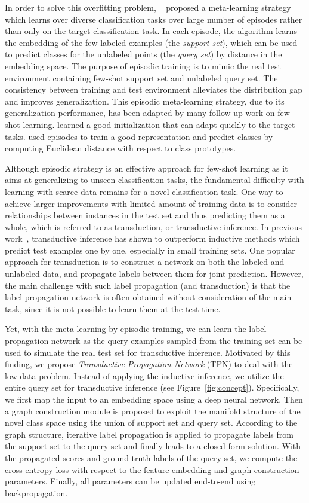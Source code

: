 \documentclass{article} \usepackage{iclr2019_conference,times}
\begin{document}
In order to solve this overfitting problem, ~\cite{matching} proposed a meta-learning strategy which learns over diverse classification tasks over large number of episodes rather than only on the target classification task. In each episode, the algorithm learns the embedding of the few labeled examples (the \textit{support set}), which can be used to predict classes for the unlabeled points (the \textit{query set}) by distance in the embedding space. The purpose of episodic training is to mimic the real test environment containing few-shot support set and unlabeled query set. The consistency between training and test environment alleviates the distribution gap and improves generalization. This episodic meta-learning strategy, due to its generalization performance, has been adapted by many follow-up work on few-shot learning. \cite{maml} learned a good initialization that can adapt quickly to the target tasks. \cite{prototypical} used episodes to train a good representation and predict classes by computing Euclidean distance with respect to class prototypes. 

Although episodic strategy is an effective approach for few-shot learning as it aims at generalizing to unseen classification tasks, the fundamental difficulty with learning with scarce data remains for a novel classification task. One way to achieve larger improvements with limited amount of training data is to consider relationships between instances in the test set and thus predicting them as a whole, which is referred to as transduction, or transductive inference. In previous work~\citep{tsvm,labelprop1,vapnik}, transductive inference has shown to outperform inductive methods which predict test examples one by one, especially in small training sets. One popular approach for transduction is to construct a network on both the labeled and unlabeled data, and propagate labels between them for joint prediction. However, the main challenge with such label propagation (and transduction) is that the label propagation network is often obtained without consideration of the main task, since it is not possible to learn them at the test time.

Yet, with the meta-learning by episodic training, we can learn the label propagation network as the query examples sampled from the training set can be used to simulate the real test set for transductive inference. Motivated by this finding, we propose \textit{Transductive Propagation Network} (TPN) to deal with the low-data problem. Instead of applying the inductive inference, we utilize the entire query set for transductive inference (see Figure~\ref{fig:concept}). Specifically, we first map the input to an embedding space using a deep neural network. Then a graph construction module is proposed to exploit the manifold structure of the novel class space using the union of support set and query set. According to the graph structure, iterative label propagation is applied to propagate labels from the support set to the query set and finally leads to a closed-form solution. With the propagated scores and ground truth labels of the query set, we compute the cross-entropy loss with respect to the feature embedding and graph construction parameters. Finally, all parameters can be updated end-to-end using backpropagation.
\end{document}
